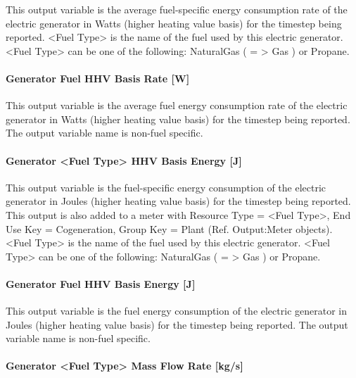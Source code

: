 This output variable is the average fuel-specific energy consumption rate of the electric generator in Watts (higher heating value basis) for the timestep being reported. \textless{}Fuel Type\textgreater{} is the name of the fuel used by this electric generator. \textless{}Fuel Type\textgreater{} can be one of the following: NaturalGas ( = \textgreater{} Gas ) or Propane.

\paragraph{Generator Fuel HHV Basis Rate {[}W{]}}\label{generator-fuel-hhv-basis-rate-w-1}

This output variable is the average fuel energy consumption rate of the electric generator in Watts (higher heating value basis) for the timestep being reported. The output variable name is non-fuel specific.

\paragraph{Generator \textless{}Fuel Type\textgreater{} HHV Basis Energy {[}J{]}}\label{generator-fuel-type-hhv-basis-energy-j}

This output variable is the fuel-specific energy consumption of the electric generator in Joules (higher heating value basis) for the timestep being reported. This output is also added to a meter with Resource Type = \textless{}Fuel Type\textgreater{}, End Use Key = Cogeneration, Group Key = Plant (Ref. Output:Meter objects). \textless{}Fuel Type\textgreater{} is the name of the fuel used by this electric generator. \textless{}Fuel Type\textgreater{} can be one of the following: NaturalGas ( = \textgreater{} Gas ) or Propane.

\paragraph{Generator Fuel HHV Basis Energy {[}J{]}}\label{generator-fuel-hhv-basis-energy-j-1}

This output variable is the fuel energy consumption of the electric generator in Joules (higher heating value basis) for the timestep being reported. The output variable name is non-fuel specific.

\paragraph{Generator \textless{}Fuel Type\textgreater{} Mass Flow Rate {[}kg/s{]}}\label{generator-fuel-type-mass-flow-rate-kgs-2}

